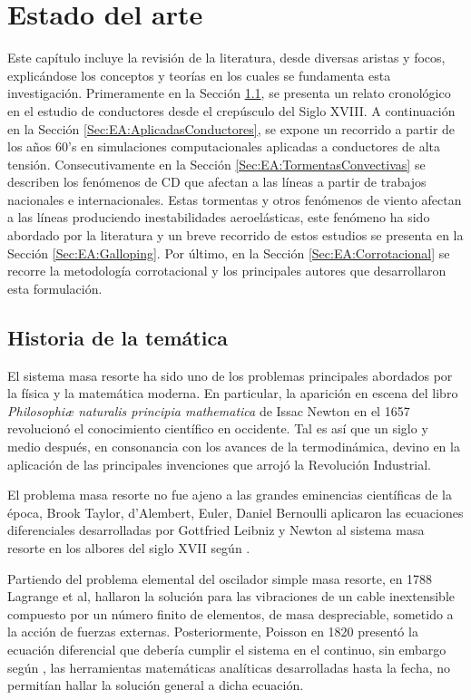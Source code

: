\chapter{Estado del arte}\label{Cap:EstadoDelArte}\linenumbers

Este capítulo incluye la revisión de la literatura, desde diversas aristas y focos, explicándose los conceptos y teorías en los cuales se fundamenta esta investigación. Primeramente en la Sección \ref{Sec:EA:Historia}, se presenta un relato cronológico en el estudio de conductores desde el crepúsculo del Siglo XVIII. A continuación en la Sección \ref{Sec:EA:AplicadasConductores}, se expone un recorrido a partir de los años 60's en simulaciones computacionales aplicadas a conductores de alta tensión. Consecutivamente en la Sección \ref{Sec:EA:TormentasConvectivas} se describen los fenómenos de CD que afectan a las líneas a partir de trabajos nacionales e internacionales. Estas tormentas y otros fenómenos de viento afectan a las líneas produciendo inestabilidades aeroelásticas, este fenómeno ha sido abordado por la literatura y un breve recorrido de estos estudios se presenta en la Sección \ref{Sec:EA:Galloping}. Por último, en la Sección \ref{Sec:EA:Corrotacional} se recorre la metodología corrotacional y los principales autores que desarrollaron esta formulación. 

\section{Historia de la temática}\label{Sec:EA:Historia}
El sistema masa resorte ha sido uno de los problemas principales abordados por la física y la matemática moderna. En particular, la aparición en escena del libro \emph{Philosophiæ naturalis principia mathematica} de Issac Newton en el 1657 revolucionó el conocimiento científico en occidente. Tal es así que un siglo y medio después, en consonancia con los avances de la termodinámica, devino en la aplicación de las principales invenciones que arrojó la Revolución Industrial.

El problema masa resorte no fue ajeno a las grandes eminencias científicas de la época, Brook Taylor, d'Alembert, Euler, Daniel Bernoulli aplicaron las ecuaciones diferenciales desarrolladas por Gottfried Leibniz y Newton al sistema masa resorte en los albores del siglo XVII según \cite{Starossek1991}.  

Partiendo del problema elemental del oscilador simple masa resorte, en 1788 Lagrange et al, hallaron la solución para las vibraciones de un cable inextensible compuesto por un número finito de elementos, de masa despreciable, sometido a la acción de fuerzas externas. Posteriormente, Poisson en 1820 presentó la ecuación diferencial que debería cumplir el sistema en el continuo, sin embargo según \cite{Irvine1974}, las herramientas matemáticas analíticas desarrolladas hasta la fecha, no permitían hallar la solución general a dicha ecuación.

